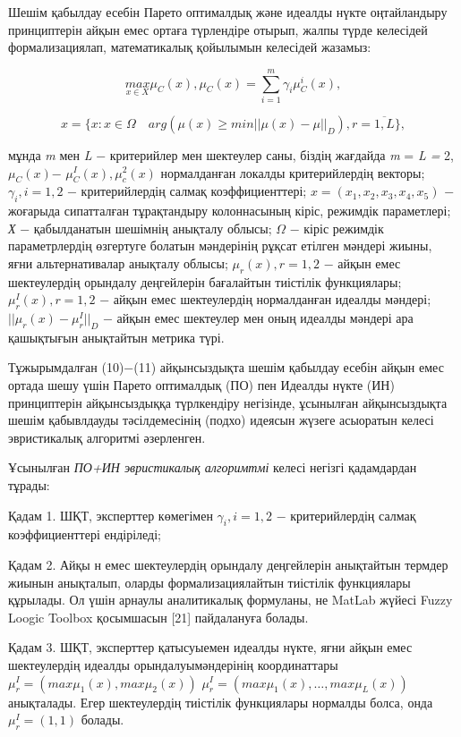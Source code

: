 Шешім қабылдау есебін Парето оптималдық және идеалды нүкте оңтайландыру
принциптерін айқын емес ортаға түрлендіре отырып, жалпы түрде келесідей
формализациялап, математикалық қойылымын келесідей жазамыз:

\begin{equation}
\underset{x\in X}{max}\mu_C(x),\mu_C(x)=\sum_{i=1}^m\gamma_i\mu_C^i(x),
\end{equation}

\begin{equation}
x = \{ x : x \in \Omega \hat{}\quad arg(\mu(x)\geq min ||\mu(x)-\mu||_D),r=\overline{1,L}\},
\end{equation}

мұнда \emph{m} мен \emph{L} − критерийлер мен шектеулер саны, біздің
жағдайда \emph{m} = \emph{L =} 2, $\mu_C(x)$−
$\mu^I_C(x),\mu_c^2(x)$ нормалданған локалды критерийлердің
векторы; $\gamma_i,i=1,2$ − критерийлердің салмақ
коэффициенттері; $x=(x_1,x_2,x_3,x_4,x_5)$ − жоғарыда
сипатталған тұрақтандыру колоннасының кіріс, режимдік параметлері;
\emph{Х} − қабылданатын шешімнің анықталу облысы;
$\Omega$ − кіріс режимдік параметрлердің
өзгертуге болатын мәндерінің рұқсат етілген мәндері жиыны, яғни
альтернативалар анықталу облысы; $\mu_r(x),r=1,2$ −
айқын емес шектеулердің орындалу деңгейлерін бағалайтын тиістілік
функциялары; $\mu_r^I(x),r=1,2$ − айқын емес
шектеулердің нормалданған идеалды мәндері;
$||\mu_r(x)-\mu_r^I||_D$ − айқын емес шектеулер мен оның
идеалды мәндері ара қашықтығын анықтайтын метрика түрі.

Тұжырымдалған (10)−(11) айқынсыздықта шешім қабылдау есебін айқын емес
ортада шешу үшін Парето оптималдық (ПО) пен Идеалды нүкте (ИН)
принциптерін айқынсыздыққа түрлкендіру негізінде, ұсынылған
айқынсыздықта шешім қабывлдауды тәсілдемесінің (подхо) идеясын жүзеге
асыоратын келесі эвристикалық алгоритмі әзерленген.

Ұсынылған \emph{ПО+ИН эвристикалық алгоримтмі} келесі негізгі
қадамдардан тұрады:

Қадам 1. ШҚТ, эксперттер көмегімен $\gamma_i,i=1,2$ − критерийлердің
салмақ коэффициенттері ендіріледі;

Қадам 2. Айқы н емес шектеулердің орындалу деңгейлерін анықтайтын
термдер жиынын анықталып, оларды формализациялайтын тиістілік
функциялары құрылады. Ол үшін арнаулы аналитикалық формуланы, не
MatLab жүйесі Fuzzy Loogic Toolbox қосымшасын {[}21{]} пайдалануға
болады.

Қадам 3. ШҚТ, эксперттер қатысуыемен идеалды нүкте, яғни айқын емес
шектеулердің идеалды орындалуымәндерінің координаттары
$\mu_r^I=(max\mu_1(x),max\mu_2(x))$ \(\mu_{r}^{I} = \left(
{max\mu}_{1}(x),\ldots,{max\mu}_{L}(x) \right)\) анықталады. Егер
шектеулердің тиістілік функциялары нормалды болса, онда
$\mu_r^I=(1,1)$ болады.

